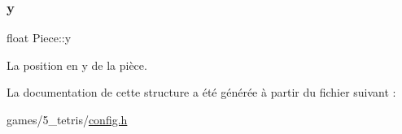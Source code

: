 \subsubsection{\texorpdfstring{y}{y}}
{\footnotesize\ttfamily float Piece\+::y}



La position en y de la pièce. 



La documentation de cette structure a été générée à partir du fichier suivant \+:\begin{DoxyCompactItemize}
\item 
games/5\+\_\+tetris/\hyperlink{5__tetris_2config_8h}{config.\+h}\end{DoxyCompactItemize}
